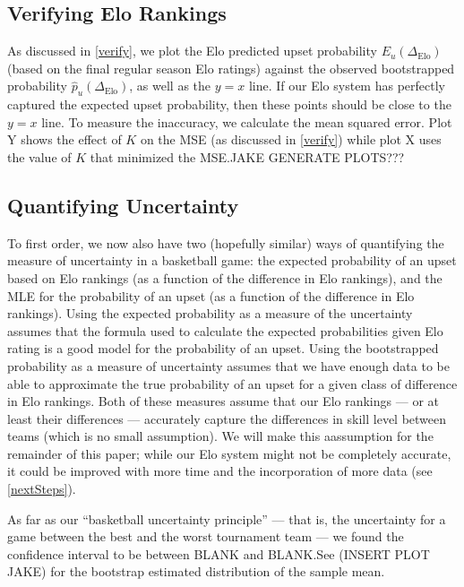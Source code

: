 \documentclass{article}
\begin{document}
\subsection{Verifying Elo Rankings}
As discussed in \autoref{verify}, we plot the Elo predicted upset probability $E_u(\Delta_{\text{Elo}})$ (based on the final regular season Elo ratings) against the observed bootstrapped probability $\hat{p}_u(\Delta_{\text{Elo}})$, as well as the $y=x$ line. If our Elo system has perfectly captured the expected upset probability, then these points should be close to the $y=x$ line. To measure the inaccuracy, we calculate the mean squared error. Plot Y shows the effect of $K$ on the MSE (as discussed in \autoref{verify}) while plot X uses the value of $K$ that minimized the MSE.\@ JAKE GENERATE PLOTS???

\subsection{Quantifying Uncertainty}
To first order, we now also have two (hopefully similar) ways of quantifying the measure of uncertainty in a basketball game: the expected probability of an upset based on Elo rankings (as a function of the difference in Elo rankings), and the MLE for the probability of an upset (as a function of the difference in Elo rankings). Using the expected probability as a measure of the uncertainty assumes that the formula used to calculate the expected probabilities given Elo rating is a good model for the probability of an upset. Using the bootstrapped probability as a measure of uncertainty assumes that we have enough data to be able to approximate the true probability of an upset for a given class of difference in Elo rankings. Both of these measures assume that our Elo rankings --- or at least their differences --- accurately capture the differences in skill level between teams (which is no small assumption). We will make this aassumption for the remainder of this paper; while our Elo system might not be completely accurate, it could be improved with more time and the incorporation of more data (see \autoref{nextSteps}).

As far as our ``basketball uncertainty principle'' --- that is, the uncertainty for a game between the best and the worst tournament team --- we found the confidence interval to be between BLANK and BLANK.\@ See (INSERT PLOT JAKE) for the bootstrap estimated distribution of the sample mean.
 

\end{document}
